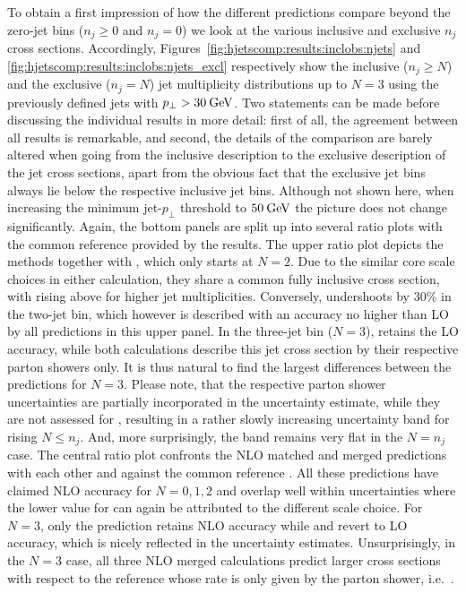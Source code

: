 To obtain a first impression of how the different predictions 
compare beyond the zero-jet bins ($n_j\ge0$ and $n_j=0$) we 
look at the various inclusive and exclusive $n_j$ cross sections.
Accordingly, Figures~\ref{fig:hjetscomp:results:inclobs:njets} and
\ref{fig:hjetscomp:results:inclobs:njets_excl} respectively show the
inclusive ($n_j\ge N$) and the exclusive ($n_j=N$) jet multiplicity
distributions up to $N=3$ using the previously defined \antikt jets
with $p_\perp>30\text{\:GeV}$. Two statements can be made before discussing
the individual results in more detail:
first of all, the agreement between all results is remarkable, and
second, the details of the comparison are barely altered when going
from the inclusive description to the exclusive description of the jet
cross sections, apart from the obvious fact that the exclusive jet
bins always lie below the respective inclusive jet bins. Although not
shown here, when increasing the minimum jet-$p_\perp$ threshold to
$50\text{\:GeV}$ the picture does not change significantly.
Again, the bottom panels are split up into several ratio plots with
the common reference provided by the \Powheg \NNLOPS results. The
upper ratio plot depicts the \NNLOPS methods together
with \Hej, which only starts at $N=2$. Due to the similar core scale
choices in either \NNLOPS calculation, they share a common fully
inclusive cross section, with \Sherpa rising above \Powheg for higher
jet multiplicities. Conversely, \Hej undershoots by 30\% in the
two-jet bin, which however is described with an accuracy no higher
than LO by all predictions in this upper panel. In the three-jet bin
($N=3$), \Hej retains the LO accuracy, while both \NNLOPS calculations
describe this jet cross section by their respective parton showers
only. It is thus natural to find the largest differences between the
\NNLOPS predictions for $N=3$. Please note, that the respective parton
shower uncertainties are partially incorporated in the \Sherpa \NNLOPS
uncertainty estimate, while they are not assessed for \Powheg,
resulting in a rather slowly increasing uncertainty band for rising
$N\le n_j$. And, more surprisingly, the \Powheg band remains very flat
in the $N=n_j$ case. The central ratio plot
confronts the NLO matched and merged predictions with each other and
against the common reference \Powheg \NNLOPS. All these predictions
have claimed NLO accuracy for $N=0,1,2$ and overlap well within
uncertainties where the lower value for \MGaMC can again be attributed
to the different scale choice. For $N=3$, only the \Sherpa \MEPSatNLO
prediction retains NLO accuracy while \MGaMC and \Herwig revert to LO
accuracy, which is nicely reflected in the uncertainty estimates. 
Unsurprisingly, in the $N=3$ case, all three NLO merged calculations
predict larger cross sections with respect to the reference whose rate
is only given by the parton shower, i.e.~\Pythia.

